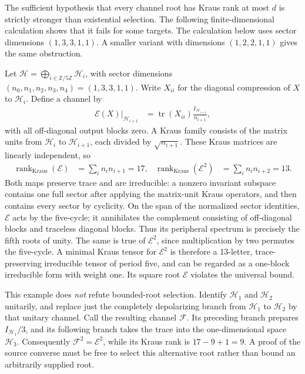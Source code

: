 \documentclass{article}
\begin{document}
The sufficient hypothesis that every channel root has Kraus rank at most $d$
is strictly stronger than existential selection. The following
finite-dimensional calculation shows that it fails for some targets. The calculation below uses sector dimensions $(1,3,3,1,1)$. A smaller
variant with dimensions $(1,2,2,1,1)$ gives the same obstruction.

Let $\mathcal H=\bigoplus_{i\in\mathbb Z/5\mathbb Z}\mathcal H_i$, with
sector dimensions $(n_0,n_1,n_2,n_3,n_4)=(1,3,3,1,1)$. Write $X_{ii}$ for the
diagonal compression of $X$ to $\mathcal H_i$. Define a channel by
\begin{align}
  \mathcal E(X)|_{\mathcal H_{i+1}}
    &=\operatorname{tr}(X_{ii})\frac{I_{\mathcal H_{i+1}}}{n_{i+1}},
  \label{eq:dccsp17_cyclic_root_channel}
\end{align}
with all off-diagonal output blocks zero. A Kraus family consists of the
matrix units from $\mathcal H_i$ to $\mathcal H_{i+1}$, each divided by
$\sqrt{n_{i+1}}$. These Kraus matrices are linearly independent, so
\begin{align}
  \operatorname{rank}_{\mathrm{Kraus}}(\mathcal E)
    &=\sum_i n_i n_{i+1}=17, &
  \operatorname{rank}_{\mathrm{Kraus}}(\mathcal E^2)
    &=\sum_i n_i n_{i+2}=13.
  \label{eq:dccsp17_cyclic_root_ranks}
\end{align}
Both maps preserve trace and are irreducible: a nonzero invariant subspace
contains one full sector after applying the matrix-unit Kraus operators,
and then contains every sector by cyclicity. On the span of the normalized
sector identities, $\mathcal E$ acts by the five-cycle; it annihilates the
complement consisting of off-diagonal blocks and traceless diagonal blocks.
Thus its peripheral spectrum is precisely the fifth roots of unity. The
same is true of $\mathcal E^2$, since multiplication by two permutes the
five-cycle. A minimal Kraus tensor for $\mathcal E^2$ is therefore a
13-letter, trace-preserving irreducible tensor of period five, and can be
regarded as a one-block irreducible form with weight one. Its square root
$\mathcal E$ violates the universal bound.

This example does \emph{not} refute bounded-root selection. Identify
$\mathcal H_1$ and $\mathcal H_2$ unitarily, and replace just the completely
depolarizing branch from $\mathcal H_1$ to $\mathcal H_2$ by that unitary
channel. Call the resulting channel $\mathcal F$. Its preceding branch
prepares $I_{\mathcal H_1}/3$, and its following branch takes the trace into
the one-dimensional space $\mathcal H_3$. Consequently
$\mathcal F^2=\mathcal E^2$, while its Kraus rank is
$17-9+1=9$. A proof of the source converse must be free to select this
alternative root rather than bound an arbitrarily supplied root.
\end{document}
